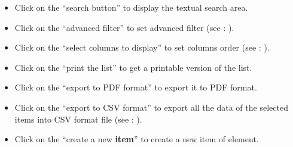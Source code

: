 \documentclass[letterpaper,10pt,english]{sphinxmanual}
\begin{document}
\begin{itemize}
\item {} 
Click on the “search button”  to display the textual search area.

\item {} 
Click on the “advanced filter”  to set advanced filter (see : {\hyperref[Gui:gui-advanced-filter-label]{\emph{}}}).

\item {} 
Click on the “select columns to display”  to set columns order (see : {\hyperref[Gui:gui-diplayed-columns-label]{\emph{}}}).

\item {} 
Click on the “print the list”  to get a printable version of the list.

\item {} 
Click on the “export to PDF format”  to export it to PDF format.

\item {} 
Click on the “export to CSV format”  to export all the data of the selected items into CSV format file (see : {\hyperref[Gui:gui-exportcsv-format-label]{\emph{}}}).

\item {} 
Click on the “create a new \textbf{item}”  to create a new item of element.

\end{itemize}
\end{document}

